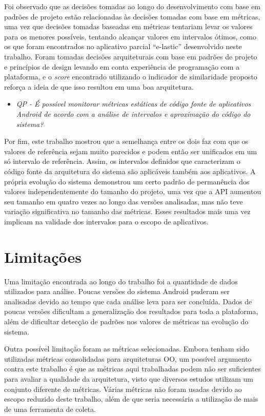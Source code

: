 Foi observado que as decisões tomadas ao longo do desenvolvimento com base em padrões de projeto estão relacionadas às decisões tomadas com base em métricas, uma vez que decisões tomadas baseadas em métricas tentariam levar os valores para os menores possíveis, tentando alcançar valores em intervalos ótimos, como os que foram encontrados no aplicativo parcial ``e-lastic'' desenvolvido neste trabalho. Foram tomadas decisões arquiteturais com base em padrões de projeto e princípios de design levando em conta experiência de programação com a plataforma, e o \textit{score} encontrado utilizando o indicador de similaridade proposto reforça a ideia de que isso resultou em uma boa arquitetura.

\begin{itemize}
\item \textit{QP - É possível monitorar métricas estáticas de código fonte de aplicativos Android de acordo com a análise de intervalos e aproximação do código do sistema?}
\end{itemize}

Por fim, este trabalho mostrou que a semelhança entre os dois faz com que os valores de referência sejam muito parecidos e podem então ser unificados em um só intervalo de referência. Assim, os intervalos definidos que caracterizam o código fonte da arquitetura do sistema são aplicáveis também aos aplicativos. A própria evolução do sistema demonstrou um certo padrão de permanência dos valores independentemente do tamanho do projeto, uma vez que a API aumentou seu tamanho em quatro vezes ao longo das versões analisadas, mas não teve variação significativa no tamanho das métricas. Esses resultados mais uma vez implicam na validade dos intervalos para o escopo de aplicativos.

\section{Limitações}

Uma limitação encontrada ao longo do trabalho foi a quantidade de dados utilizados para análise. Poucas versões do sistema Android puderam ser analisadas devido ao tempo que cada análise leva para ser concluída. Dados de poucas versões dificultam a generalização dos resultados para toda a plataforma, além de dificultar detecção de padrões nos valores de métricas na evolução do sistema.

Outra possível limitação foram as métricas selecionadas. Embora tenham sido utilizadas métricas consolidadas para arquiteturas OO, um possível argumento contra este trabalho é que as métricas aqui trabalhadas podem não ser suficientes para avaliar a qualidade da arquitetura, visto que diversos estudos utilizam um conjunto diferente de métricas. Várias métricas não foram usadas devido ao escopo reduzido deste trabalho, além de que seria necessária a utilização de mais de uma ferramenta de coleta.

